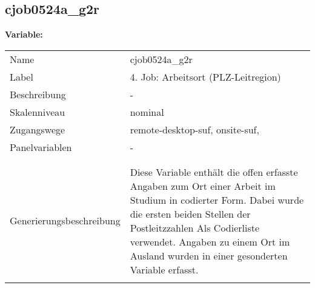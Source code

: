 	
	
	\subsection{cjob0524a\_g2r}
	\label{subSection:cjob0524a_g2r}

	\noindent\textbf{Variable:}\\
		\begin{tabular}{lL{11.3cm}}
			\label{tableVariable:cjob0524a_g2r}
			Name & cjob0524a\_g2r \\
			Label & 4. Job: Arbeitsort (PLZ-Leitregion) \\
			Beschreibung & - \\
			Skalenniveau & nominal \\
			Zugangswege &
				remote-desktop-suf,
				onsite-suf,
 \\
			Panelvariablen & -
			 \\
			 \\
 \\
					Generierungsbeschreibung & Diese Variable enthält die offen erfasste Angaben zum Ort einer Arbeit im Studium in codierter Form. Dabei wurde die ersten beiden Stellen der Postleitzzahlen Als Codierliste verwendet. Angaben zu einem Ort im Ausland wurden in einer gesonderten Variable erfasst.
				 \\	
			 \\
		\end{tabular}






